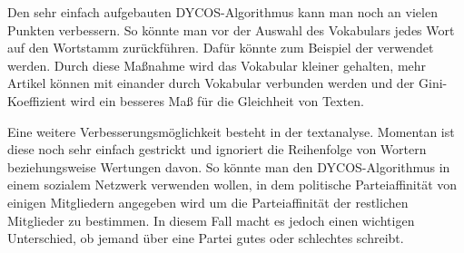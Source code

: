Den sehr einfach aufgebauten DYCOS-Algorithmus kann man noch an
vielen Punkten verbessern. So könnte man vor der Auswahl des
Vokabulars jedes Wort auf den Wortstamm zurückführen.
Dafür könnte zum Beispiel der  verwendet 
werden. Durch diese Maßnahme wird das
Vokabular kleiner gehalten, mehr Artikel können mit einander
durch Vokabular verbunden werden und der Gini-Koeffizient wird ein
besseres Maß für die Gleichheit von Texten.

Eine weitere Verbesserungsmöglichkeit besteht in der textanalyse.
Momentan ist diese noch sehr einfach gestrickt und ignoriert die
Reihenfolge von Wortern beziehungsweise Wertungen davon. So könnte
man den DYCOS-Algorithmus in einem sozialem Netzwerk verwenden wollen,
in dem politische Parteiaffinität von einigen Mitgliedern angegeben
wird um die Parteiaffinität der restlichen Mitglieder zu bestimmen.
In diesem Fall macht es jedoch einen wichtigen Unterschied, ob jemand
über eine Partei gutes oder schlechtes schreibt.
